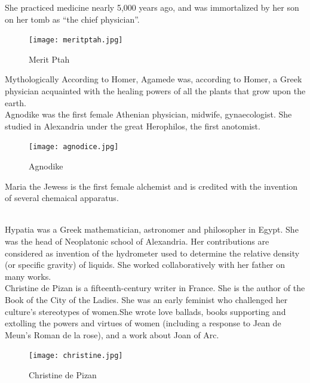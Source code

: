 \documentclass[a4paper,10pt]{article}
\begin{document}
She practiced medicine nearly 5,000 years ago, and was immortalized by her son on her tomb as “the chief physician”\cite{merit}.
\begin{center}
\begin{figure}[h]
\centering
 \texttt{[image: meritptah.jpg]}
 \caption{Merit Ptah}
\end{figure}
\end{center}

\newblock
Mythologically According to Homer, Agamede was, according to Homer, a Greek physician acquainted with the healing powers of all the plants that grow upon the earth.\\

\newblock
Agnodike was the first female Athenian physician, midwife, gynaecologist. She studied in Alexandria under the great Herophilos, the first anotomist.

\begin{center}
\begin{figure}[h]
\centering
 \texttt{[image: agnodice.jpg]}
 \caption{Agnodike}
\end{figure}
\end{center}

\newblock
Maria the Jewess is the first female alchemist and is credited with the invention of several chemaical apparatus.

\newblock
\\Hypatia was a Greek mathematician, astronomer and philosopher in Egypt. She was the head of Neoplatonic school of Alexandria. Her contributions are considered as invention of the hydrometer used to determine the relative density (or specific gravity) of liquids. She worked collaboratively with her father on many works.\\

\newblock
Christine de Pizan is a fifteenth-century writer in France. She is the author of the Book of the City of the Ladies. She was an early feminist who challenged her culture's stereotypes of women.She wrote love ballads, books supporting and extolling the powers and virtues of women (including a response to Jean de Meun's Roman de la rose), and a work about Joan of Arc.\cite{christine}\\

\begin{center}
\begin{figure}[h]
\centering
 \texttt{[image: christine.jpg]}
 \caption{Christine de Pizan}
\end{figure}
\end{center}
\end{document}

